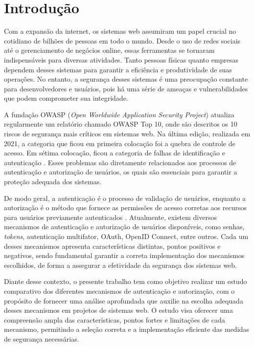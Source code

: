 \section{Introdução}

Com a expansão da internet, os sistemas web assumiram um papel crucial no cotidiano de bilhões de
pessoas em todo o mundo. Desde o uso de redes sociais até o gerenciamento de negócios online, essas
ferramentas se tornaram indispensáveis para diversas atividades. Tanto pessoas físicas quanto
empresas dependem desses sistemas para garantir a eficiência e produtividade de suas operações.
No entanto, a segurança desses sistemas é uma preocupação constante para desenvolvedores e
usuários, pois há uma série de ameaças e vulnerabilidades que podem comprometer sua integridade.

A fundação OWASP (\emph{Open Worldwide Application Security Project}) atualiza regularmente um
relatório chamado OWASP Top 10, onde são descritos os 10 riscos de segurança mais críticos em
sistemas web. Na última edição, realizada em 2021, a categoria que ficou em primeira colocação foi
a quebra de controle de acesso. Em sétima colocação, ficou a categoria de falhas de identificação e
autenticação \cite{OWASP2021}. Esses problemas são diretamente relacionados aos processos de
autenticação e autorização de usuários, os quais são essenciais para garantir a proteção adequada
dos sistemas.

De modo geral, a autenticação é o processo de validação de usuários, enquanto a autorização é o
método que fornece as permissões de acesso corretas aos recursos para usuários previamente
autenticados \cite{TUMIN2012}. Atualmente, existem diversos mecanismos de autenticação e autorização
de usuários disponíveis, como senhas, \emph{tokens}, autenticação multifator, OAuth, OpenID Connect, entre
outros. Cada um desses mecanismos apresenta características distintas, pontos positivos e negativos,
sendo fundamental garantir a correta implementação dos mecanismos escolhidos, de forma a assegurar
a efetividade da segurança dos sistemas web.

Diante desse contexto, o presente trabalho tem como objetivo realizar um estudo
comparativo dos diferentes mecanismos de autenticação e autorização, com o propósito
de fornecer uma análise aprofundada que auxilie na escolha adequada desses mecanismos
em projetos de sistemas web. O estudo visa oferecer uma compreensão ampla das
características, pontos fortes e limitações de cada mecanismo, permitindo a seleção
correta e a implementação eficiente das medidas de segurança necessárias.